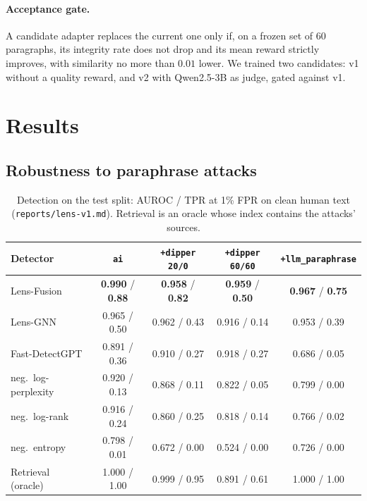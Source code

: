 \documentclass[11pt]{article}
\newcommand{\fy}[1]{\texttt{#1}}
\begin{document}
\paragraph{Acceptance gate.}
A candidate adapter replaces the current one only if, on a frozen set of 60 paragraphs, its integrity rate does not drop and its mean reward strictly improves, with similarity no more than $0.01$ lower.
We trained two candidates: v1 without a quality reward, and v2 with Qwen2.5-3B as judge, gated against v1.

\section{Results}
\label{sec:results}

\subsection{Robustness to paraphrase attacks}

\begin{table}[t]
\centering
\caption{Detection on the test split: AUROC / TPR at 1\% FPR on clean human text (\texttt{reports/lens-v1.md}). Retrieval is an oracle whose index contains the attacks' sources.}
\label{tab:main}
\small
\begin{tabular}{lcccc}
\toprule
Detector & \fy{ai} & \fy{+dipper 20/0} & \fy{+dipper 60/60} & \fy{+llm\_paraphrase} \\
\midrule
Lens-Fusion & \textbf{0.990} / \textbf{0.88} & \textbf{0.958} / \textbf{0.82} & \textbf{0.959} / \textbf{0.50} & \textbf{0.967} / \textbf{0.75} \\
Lens-GNN & 0.965 / 0.50 & 0.962 / 0.43 & 0.916 / 0.14 & 0.953 / 0.39 \\
Fast-DetectGPT & 0.891 / 0.36 & 0.910 / 0.27 & 0.918 / 0.27 & 0.686 / 0.05 \\
neg.\ log-perplexity & 0.920 / 0.13 & 0.868 / 0.11 & 0.822 / 0.05 & 0.799 / 0.00 \\
neg.\ log-rank & 0.916 / 0.24 & 0.860 / 0.25 & 0.818 / 0.14 & 0.766 / 0.02 \\
neg.\ entropy & 0.798 / 0.01 & 0.672 / 0.00 & 0.524 / 0.00 & 0.726 / 0.00 \\
\midrule
Retrieval (oracle) & 1.000 / 1.00 & 0.999 / 0.95 & 0.891 / 0.61 & 1.000 / 1.00 \\
\bottomrule
\end{tabular}
\end{table}
\end{document}
